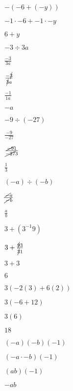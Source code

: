 \documentclass{article}
\begin{document}
\begin{enumerate}[start=28]
    \item $-(-6 + (-y))$
    \begin{center}
        \item $-1 \cdot -6 + -1 \cdot -y$
        \item $6 + y$
    \end{center}

    \item $-3 \div 3a$
    \begin{center}
        \item $\frac{-3}{3a}$
        \item $\frac{-\cancel{3}}{\cancel{3}a}$
        \item $\frac{-1}{1a}$
        \item $-a$
    \end{center}

    \item $-9 \div (-27)$
    \begin{center}
        \item $\frac{-9}{-27}$
        \item $\frac{\cancel{-9}1}{\cancel{-27}3}$
        \item $\frac{1}{3}$
    \end{center}

    \item $(-a) \div (-b)$
    \begin{center}
        \item $\frac{\cancel{-}a}{\cancel{-}b}$
        \item $\frac{a}{b}$
    \end{center}

    \item $3 + (3^{-1}9)$
    \begin{center}
        \item $3 + \frac{\cancel{9}3}{\cancel{3}1}$
        \item $3 + 3$
        \item $6$
    \end{center}

    \item $3(-2(3) + 6(2))$
    \begin{center}
        \item $3(-6 + 12)$
        \item $3(6)$
        \item $18$
    \end{center}

    \item $(-a)(-b)(-1)$
    \begin{center}
        \item $(-a \cdot -b)(-1)$
        \item $(ab)(-1)$
        \item $-ab$
    \end{center}


\end{enumerate}
\end{document}
